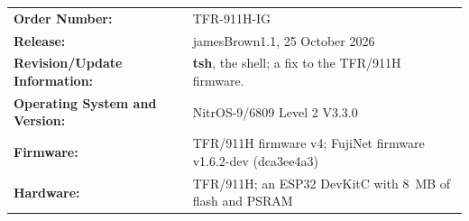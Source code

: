 \documentclass[10pt,twoside,openany]{book}
\newcommand{\release}{jamesBrown1.1}
\newcommand{\docdate}{25 October 2026}
\newcommand{\cmd}[1]{\textbf{#1}}            %
\begin{document}
\vspace{0.2in}
{\sffamily
\begin{tabular}{@{}l l@{}}
\bfseries Order Number: & TFR-911H-IG\\[3pt]
\bfseries Release: & \release, \docdate\\[3pt]
\bfseries Revision/Update Information: & \cmd{tsh}, the shell; a fix to the TFR/911H firmware.\\[3pt]
\bfseries Operating System and Version: & NitrOS-9/6809 Level 2 V3.3.0\\[3pt]
\bfseries Firmware: & TFR/911H firmware v4; FujiNet firmware v1.6.2-dev (dca3ee4a3)\\[3pt]
\bfseries Hardware: & TFR/911H; an ESP32 DevKitC with 8~MB of flash and PSRAM\\
\end{tabular}\par}
\vspace*{\fill}
\end{document}
